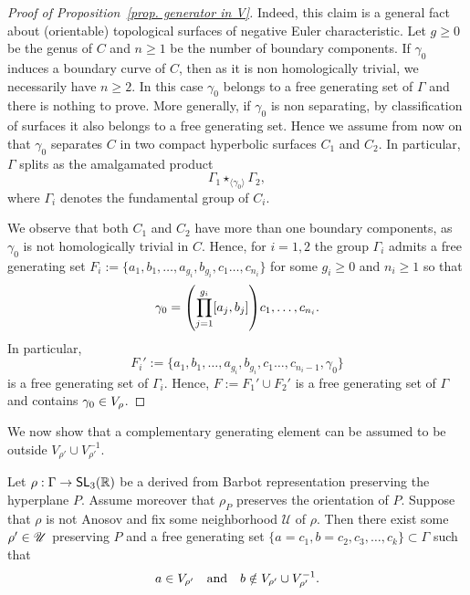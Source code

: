 \documentclass[AHL,Unicode,longabstracts]{cedram}
\DeclareMathOperator{\SL}{\mathsf{SL}}
\newcommand{\R}{\mathbb{R}}
\newcommand{\RR}{\R}
\newcommand{\scU}{\mathscr{U}}
\renewcommand*{\to}{\mathchoice{\longrightarrow}{\rightarrow}{\rightarrow}{\rightarrow}}
\let\originalleft\left
\let\originalright\right
\renewcommand{\left}{\mathopen{}\mathclose\bgroup\originalleft}
\renewcommand{\right}{\aftergroup\egroup\originalright}
\let\oldin\in
\renewcommand{\in}{\mathchoice{\oldin}{\oldin}{\,\oldin\,}{\,\oldin\,}}
\newcommand{\RR}{\mathbb{R}}
\begin{document}
\begin{proof}[Proof of Proposition~\ref{prop. generator in V}]
Indeed, this claim is a general fact about (orientable) topological surfaces of negative Euler characteristic. Let $g\geq 0$ be the genus of $C$ and $n\geq 1$ be the number of boundary components. If $\gamma_0$ induces a boundary curve of $C$, then as it is non homologically trivial, we necessarily have $n\geq 2$. In this case $\gamma_0$ belongs to a free generating set of $\Gamma$ and there is nothing to prove. More generally, if $\gamma_0$ is non separating, by classification of surfaces it also belongs to a free generating set. Hence we assume from now on that $\gamma_0$ separates $C$ in two compact hyperbolic surfaces $C_1$ and $C_2$.
In particular, $\Gamma$ splits as the amalgamated product
\[
\Gamma_1\star_{\langle\gamma_0\rangle}\Gamma_2,
\]
where $\Gamma_i$ denotes the fundamental group of $C_i$.

We observe that both $C_1$ and $C_2$ have more than one boundary components, as $\gamma_0$ is not homologically trivial in $C$.
Hence, for $i=1,2$ the group $\Gamma_i$ admits a free generating set $F_i:=\{a_1,b_1,\dots,a_{g_i},b_{g_i},c_1\dots,c_{n_i}\}$ for some $g_i\geq 0$ and $n_i\geq 1$ so that
\[
\gamma_0=\left(\prod_{j=1}^{g_i} [a_j,b_j]\right)c_1,\dots, c_{n_i}.
\]
In particular,
\[
F_i':=\{a_1,b_1,\dots,a_{g_i},b_{g_i},c_1\dots,
c_{n_i-1},\gamma_0\}
\]
is a free generating set of $\Gamma_i$.
Hence, $F:=F_1'\cup F_2'$ is a free generating set of $\Gamma$ and contains $\gamma_0\in V_{\rho}$.
\end{proof}


We now show that a complementary generating element can be assumed to be outside $V_{\rho'}\cup V_{\rho'}^{-1}$.

\begin{prop}\label{prop. generator in V and complementary not in V}
Let $\rho: \Gamma \to \SL_3(\RR)$ be a derived from Barbot representation preserving the hyperplane $P$. Assume moreover that $\rho_P$ preserves the orientation of $P$. Suppose that $\rho$ is not Anosov and fix some neighborhood $\scU$ of $\rho$.
Then there exist some $\rho'\in\scU$ preserving $P$ and a free generating set $\{a=c_1,b=c_2,c_3,\dots,c_k\}\subset \Gamma$ such that
\[
a\in V_{\rho'} \quad\text{and}\quad b\notin V_{\rho'}\cup V_{\rho'}^{-1}.
\]
\end{prop}
\end{document}
